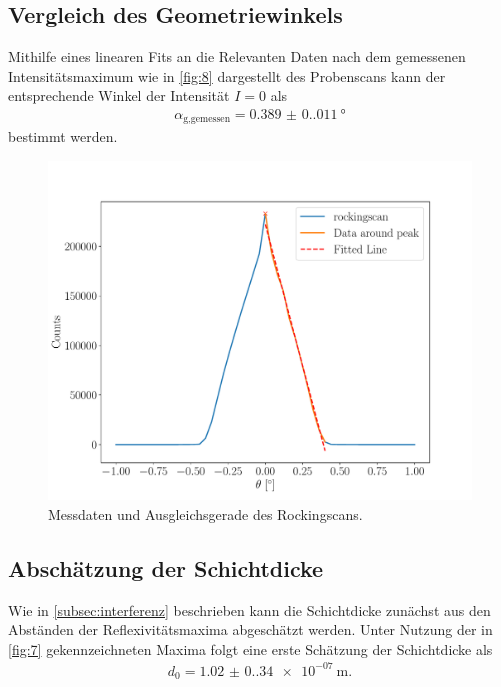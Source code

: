 \documentclass[12pt]{article}
\begin{document}
\subsection{Vergleich des Geometriewinkels}
Mithilfe eines linearen Fits an die Relevanten Daten nach dem gemessenen Intensitätsmaximum wie in \autoref{fig:8} dargestellt des Probenscans kann der entsprechende Winkel der Intensität $I=0$ als
\begin{align*}
  \alpha_\text{g,gemessen}=\SI{0.389(0.011)}{\degree}
\end{align*}
bestimmt werden. 
\begin{figure}[H]
  \centering
  \includegraphics[scale=0.5]{Ressourcen/rocking.pdf}
  \caption{Messdaten und Ausgleichsgerade des Rockingscans.}\label{fig:8}
\end{figure}
\subsection{Abschätzung der Schichtdicke}
Wie in \autoref{subsec:interferenz} beschrieben kann die Schichtdicke zunächst aus den Abständen der Reflexivitätsmaxima abgeschätzt werden.
Unter Nutzung der in \autoref{fig:7} gekennzeichneten Maxima folgt eine erste Schätzung der Schichtdicke als
\begin{align*}
  d_\text{0} = \SI{1.02(0.34)e-07}{\meter}\text{.}
\end{align*}
\end{document}
